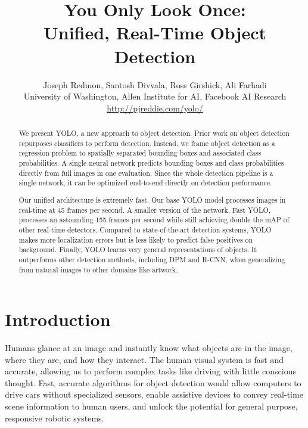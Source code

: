 \documentclass[10pt,twocolumn,letterpaper]{article}
\begin{document}
\title{\vspace{-1cm}You Only Look Once: \\
Unified, Real-Time Object Detection\vspace{-.25cm}}




\author{Joseph Redmon, Santosh Divvala, Ross Girshick, Ali Farhadi\\
\small{University of Washington, Allen Institute for AI, Facebook AI Research}\\ \url{http://pjreddie.com/yolo/}}

\maketitle


\begin{abstract}
\vspace{-.25cm}
We present YOLO, a new approach to object detection. Prior work on object detection repurposes classifiers to perform detection. Instead, we frame object detection as a regression problem to spatially separated bounding boxes and associated class probabilities. A single neural network predicts bounding boxes and class probabilities directly from full images in one evaluation. Since the whole detection pipeline is a single network, it can be optimized end-to-end directly on detection performance.

Our unified architecture is extremely fast. Our base YOLO model processes images in real-time at 45 frames per second. A smaller version of the network, Fast YOLO, processes an astounding 155 frames per second while still achieving double the mAP of other real-time detectors. Compared to state-of-the-art detection systems, YOLO makes more localization errors but is less likely to predict false positives on background. Finally, YOLO learns very general representations of objects. It outperforms other detection methods, including DPM and R-CNN, when generalizing from natural images to other domains like artwork.
\end{abstract}

\section{Introduction}

Humans glance at an image and instantly know what objects are in the image, where they are, and how they interact. The human visual system is fast and accurate, allowing us to perform complex tasks like driving with little conscious thought. Fast, accurate algorithms for object detection would allow computers to drive cars without specialized sensors, enable assistive devices to convey real-time scene information to human users, and unlock the potential for general purpose, responsive robotic systems.
\end{document}
